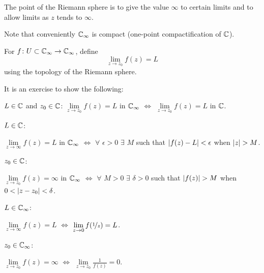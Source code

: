 \documentclass[10pt,aspectratio=169]{beamer}
\begin{document}
\begin{frame}
%
%
The point of the Riemann sphere is to give the value $\infty$ to certain
limits and to allow limits as $z$ tends to $\infty$.

\medskip
\pause

Note that conveniently
${\mathbb{C}}_\infty$ is compact (one-point compactification of ${\mathbb{C}}$).

\medskip
\pause
For $f \colon U \subset {\mathbb{C}}_\infty \to {\mathbb{C}}_\infty$, define
\begin{equation*}
\lim_{z \to z_0} f(z) = L
\end{equation*}
using the topology of the Riemann sphere.

\medskip
\pause

It is an exercise to show the following:

\medskip
\pause

$L \in {\mathbb{C}}$ and $z_0 \in {\mathbb{C}}$: \quad
$\lim\limits_{z\to z_0} f(z) = L$ in ${\mathbb{C}}_\infty$ 
$\Leftrightarrow$ $\lim\limits_{z \to z_0} f(z) = L$ in ${\mathbb{C}}$.

\medskip
\pause
\parbox{4em}{$L \in {\mathbb{C}}$:}
$\lim\limits_{z\to \infty} f(z) = L$ in ${\mathbb{C}}_\infty$
$\Leftrightarrow$ $\forall$ $\epsilon > 0$ $\exists$ $M$ such that
$\lvert {f(z)-L} \rvert < \epsilon$ when $\lvert {z} \rvert > M$.

\medskip
\pause
\parbox{4em}{$z_0 \in {\mathbb{C}}$:}
$\lim\limits_{z\to z_0} f(z) = \infty$ in ${\mathbb{C}}_\infty$
$\Leftrightarrow$ $\forall$ $M > 0$ $\exists$ $\delta > 0$ such that
$\lvert {f(z)} \rvert > M$ when $0 < \lvert {z-z_0} \rvert < \delta$.

\medskip
\pause

\parbox{4em}{$L \in {\mathbb{C}}_\infty$:}
$\lim\limits_{z\to\infty} f(z) = L$ $\Leftrightarrow$
$\lim\limits_{z \to 0} f(\nicefrac{1}{z}) = L$.

\medskip
\pause

\parbox{4em}{$z_0 \in {\mathbb{C}}_\infty$:}
$\lim\limits_{z\to z_0} f(z) = \infty$ $\Leftrightarrow$
$\lim\limits_{z \to z_0} \frac{1}{f(z)} = 0$.
\end{frame}
\end{document}
